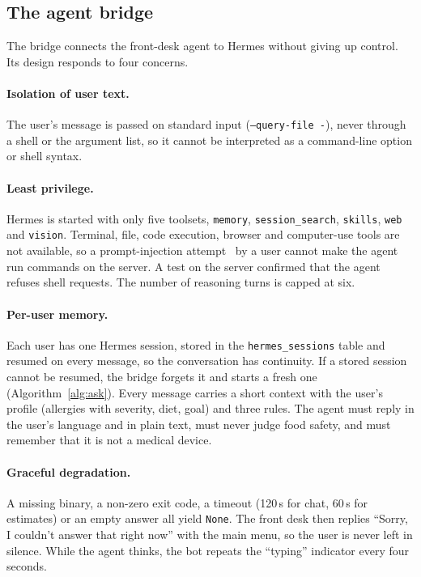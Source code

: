 \documentclass[11pt,a4paper]{article}
\begin{document}
\subsection{The agent bridge}\label{sec:bridge}

The bridge connects the front-desk agent to Hermes without giving up control. Its design responds to
four concerns.

\paragraph{Isolation of user text.} The user's message is passed on standard input
(\texttt{--query-file -}), never through a shell or the argument list, so it cannot be interpreted as a
command-line option or shell syntax.

\paragraph{Least privilege.} Hermes is started with only five toolsets, \texttt{memory},
\texttt{session\_search}, \texttt{skills}, \texttt{web} and \texttt{vision}. Terminal, file, code
execution, browser and computer-use tools are not available, so a prompt-injection
attempt~\cite{greshake2023} by a user cannot make the agent run commands on the server. A test on the
server confirmed that the agent refuses shell requests. The number of reasoning turns is capped at six.

\paragraph{Per-user memory.} Each user has one Hermes session, stored in the \texttt{hermes\_sessions}
table and resumed on every message, so the conversation has continuity. If a stored session cannot be
resumed, the bridge forgets it and starts a fresh one (Algorithm~\ref{alg:ask}). Every message carries
a short context with the user's profile (allergies with severity, diet, goal) and three rules. The
agent must reply in the user's language and in plain text, must never judge food safety, and must
remember that it is not a medical device.

\paragraph{Graceful degradation.} A missing binary, a non-zero exit code, a timeout (120\,s for chat,
60\,s for estimates) or an empty answer all yield \texttt{None}. The front desk then replies ``Sorry, I
couldn't answer that right now'' with the main menu, so the user is never left in silence. While the
agent thinks, the bot repeats the ``typing'' indicator every four seconds.
\end{document}
